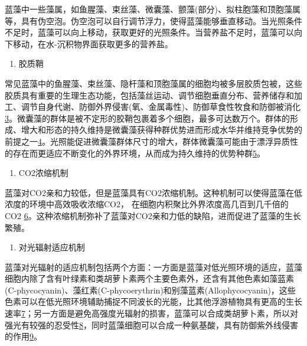 \documentclass[]{book}
\providecommand{\tightlist}{%
  \setlength{\itemsep}{0pt}\setlength{\parskip}{0pt}}
\begin{document}
蓝藻中一些藻属，如鱼腥藻、束丝藻、微囊藻、颤藻(部分)、拟柱胞藻和顶胞藻属等，具有伪空泡。伪空泡可以自行调节浮力，使得蓝藻能够垂直移动。当光照条件不足时，蓝藻可以向上移动，获取更好的光照条件。当营养盐不足时，蓝藻可以向下移动，在水-沉积物界面获取更多的营养盐。

\begin{enumerate}
\def\labelenumi{\arabic{enumi}.}
\setcounter{enumi}{1}
\tightlist
\item
  胶质鞘
\end{enumerate}

常见蓝藻中的鱼腥藻、束丝藻、隐杆藻和顶胞藻属的细胞均被多层胶质包被，这些胶质具有重要的生理生态功能，包括藻丝运动、调节细胞垂直分布、营养储存和加工、调节自身代谢、防御外界侵害(氧、金属毒性)、防御草食性牧食和防御被消化\href{Puga\%20A\%20P,\%20Abreu\%20C\%20A,\%20et\%20al.\%20J.\%20of\%20Environ.\%20Manage.,\%202015,\%20159:\%2086–93.}{3}。微囊藻的群体是被不定形的胶鞘包裹着多个细胞，最多可达数万个。群体的形成、增大和形态的持久维持是微囊藻获得种群优势进而形成水华并维持竞争优势的前提之一\href{Khan\%20S,\%20Cai\%20Chao,\%20et\%20al．\%20Environ.\%20Sci.\%20\&\%20Technol.,\%202013,\%2047\%20:\%208624-8632．}{4}。光照能促进微囊藻群体尺寸的增大，群体微囊藻可能由于漂浮异质性的存在而更适应不断变化的外界环境，从而成为持久维持的优势种群\href{Bi\%20H,\%20Huang\%20X,\%20et\%20al.\%20Small\%202014,\%2010,\%203544.}{5}。

\begin{enumerate}
\def\labelenumi{\arabic{enumi}.}
\setcounter{enumi}{2}
\tightlist
\item
  CO2浓缩机制
\end{enumerate}

蓝藻对CO2亲和力较低，但是蓝藻具有CO2浓缩机制。这种机制可以使得蓝藻在低浓度的环境中高效吸收浓缩CO2，
在细胞内积聚比外界浓度高几百到几千倍的 CO2
\href{Gupta\%20V\%20K,\%20Ganjali\%20M\%20R,\%20et\%20al.\%20Chemical\%20Engineering\%20Journal,\%202012,\%20197:\%20330.}{6}。这种浓缩机制弥补了蓝藻对CO2亲和力低的缺陷，进而促进了蓝藻的生长繁殖。

\begin{enumerate}
\def\labelenumi{\arabic{enumi}.}
\setcounter{enumi}{3}
\tightlist
\item
  对光辐射适应机制
\end{enumerate}

蓝藻对光辐射的适应机制包括两个方面：一方面是蓝藻对低光照环境的适应，蓝藻细胞内除了含有叶绿素和类胡萝卜素两个主要色素外，还含有其他色素如藻蓝素(C-phycocyanin)、藻红素(C-phycoerythrin)和别藻蓝素(Allophycocyanin)，这些色素可以在低光照环境辅助捕捉不同波长的光能，比其他浮游植物具有更高的生长速率\href{Liu\%20R\%20L,\%20Liu\%20Y,\%20et\%20al.\%20Bioresourse\%20Technology\%202014,\%20154:\%20138.}{7}；另一方面是避免高强度光辐射的损害，蓝藻可以合成类胡萝卜素，所以对强光有较强的忍受性\href{Gao\%20F,Qu\%20J\%20Y,\%20et\%20al.\%20Electrochim.\%20Acta\%202016,\%20190:\%201134.}{8}，同时蓝藻细胞可以合成一种氨基酸，具有防御紫外线侵害的作用\href{Jiang\%20J,\%20Zhu\%20J\%20H,\%20et\%20al.\%20Energy\%20Environ.\%20Sci.\%202014,\%207:\%202670.}{9}。
\end{document}
